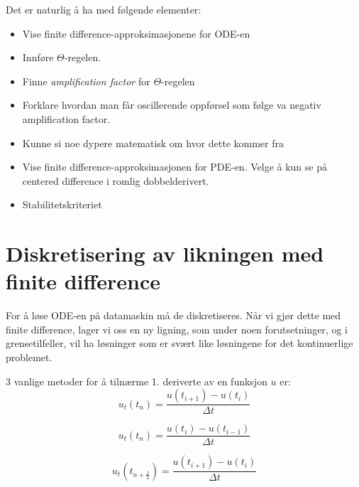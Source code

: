 \documentclass[a4paper, 10pt]{article}
\begin{document}
Det er naturlig å ha med følgende elementer:
\begin{itemize}
\item Vise finite difference-approksimasjonene for ODE-en
\item Innføre $\Theta$-regelen.
\item Finne \emph{amplification factor} for $\Theta$-regelen
\item Forklare hvordan man får oscillerende oppførsel som følge va negativ amplification factor.
\item Kunne si noe dypere matematisk om hvor dette kommer fra

\item Vise finite difference-approksimasjonen for PDE-en. Velge å kun se på centered difference i romlig dobbelderivert. 
\item Stabilitetskriteriet 
\end{itemize}

\section{Diskretisering av likningen med finite difference}
For å løse ODE-en på datamaskin må de diskretiseres. Når vi gjør dette med finite difference, lager vi oss en ny ligning, som under noen forutsetninger, og i grensetilfeller, vil ha løsninger som er svært like løsningene for det kontinuerlige problemet. 

3 vanlige metoder for å tilnærme 1. deriverte av en funksjon $u$ er: \\
\begin{equation}
	u_t(t_n) = \frac{u(t_{i+1})-u(t_i)}{\Delta t}
\end{equation}

\begin{equation}
	u_t(t_n) = \frac{u(t_{i})-u(t_{i-1})}{\Delta t}
\end{equation}

\begin{equation}
	u_t(t_{n+\frac{1}{2}}) = \frac{u(t_{i+1})-u(t_i)}{\Delta t}
\end{equation}
\end{document}
